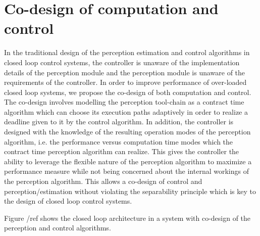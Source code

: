 

\section{Co-design of computation and control}

In the traditional design of the perception estimation and control algorithms in closed loop control systems, the controller is unaware of the implementation details of the perception module and the perception module is unaware of the requirements of the controller. In order to improve performance of over-loaded closed loop systems, we propose the co-design of both computation and control. The co-design involves modelling the perception tool-chain as a contract time algorithm which can choose its execution paths adaptively in order to realize a deadline given to it by the control algorithm. In addition, the controller is designed with the knowledge of the resulting operation modes of the perception algorithm, i.e. the performance versus computation time modes which the contract time perception algorithm can realize. This gives the controller the ability to leverage the flexible nature of the perception algorithm to maximize a performance measure while not being concerned about the internal workings of the perception algorithm. This allows a co-design of control and perception/estimation without violating the separability principle which is key to the design of closed loop control systems.

Figure /ref{} shows the closed loop architecture in a system with co-design of the perception and control algorithms. 

